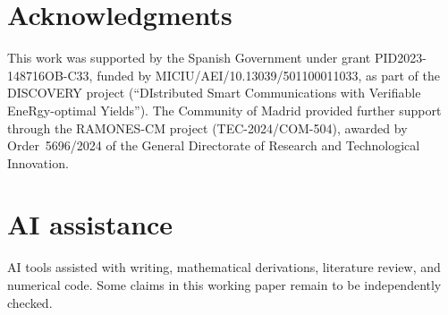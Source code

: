 \documentclass[11pt,a4paper]{article}
\begin{document}
\section*{Acknowledgments}
This work was supported by the Spanish Government under grant PID2023-148716OB-C33, funded by MICIU/AEI/10.13039/501100011033, as part of the DISCOVERY project (``DIstributed Smart Communications with Verifiable EneRgy-optimal Yields''). The Community of Madrid provided further support through the RAMONES-CM project (TEC-2024/COM-504), awarded by Order~5696/2024 of the General Directorate of Research and Technological Innovation.

\section*{AI assistance}
AI tools assisted with writing, mathematical derivations, literature review, and numerical code. Some claims in this working paper remain to be independently checked.



\end{document}
